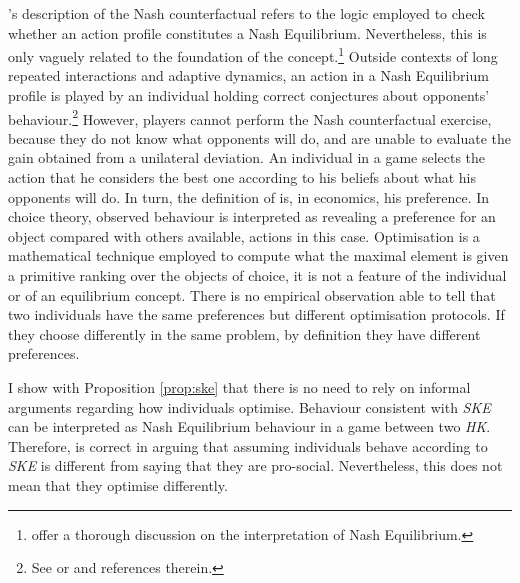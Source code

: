 \citeauthor{roemer2019cooperate}'s description of the Nash counterfactual refers to the logic employed to check whether an action profile constitutes a Nash Equilibrium. Nevertheless, this is only vaguely related to the foundation of the concept.\footnote{\cite{battigalliGameTheoryAnalysis2023} offer a thorough discussion on the interpretation of Nash Equilibrium.} Outside contexts of long repeated interactions and adaptive dynamics, an action in a Nash Equilibrium profile is played by an individual holding correct conjectures about opponents' behaviour.\footnote{See \cite{perea2012epistemic} or \cite{dekelEpistemicGameTheory2015} and references therein.} However, players cannot perform the Nash counterfactual exercise, because they do not know what opponents will do, and are unable to evaluate the gain obtained from a unilateral deviation. An individual in a game selects the action that he considers the best one according to his beliefs about what his opponents will do. In turn, the definition of  is, in economics, his preference. In choice theory, observed behaviour is interpreted as revealing a preference for an object compared with others available, actions in this case. Optimisation is a mathematical technique employed to compute what the maximal element is given a primitive ranking over the objects of choice, it is not a feature of the individual or of an equilibrium concept. There is no empirical observation able to tell that two individuals have the same preferences but different optimisation protocols. If they choose differently in the same problem, by definition they have different preferences.

I show with Proposition \ref{prop:ske} that there is no need to rely on informal arguments regarding how individuals optimise. Behaviour consistent with \textit{SKE} can be interpreted as Nash Equilibrium behaviour in a game between two \textit{HK}. Therefore, \citeauthor{roemer2019cooperate} is correct in arguing that assuming individuals behave according to \textit{SKE} is different from saying that they are pro-social. Nevertheless, this does not mean that they optimise differently.

